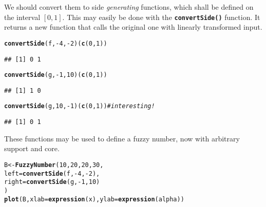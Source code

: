 \documentclass[11pt]{article}\usepackage[]{graphicx}\usepackage[]{color}
\makeatletter
\newcommand{\hlnum}[1]{\textcolor[rgb]{0.686,0.059,0.569}{#1}}%
\newcommand{\hlcom}[1]{\textcolor[rgb]{0.678,0.584,0.686}{\textit{#1}}}%
\newcommand{\hlopt}[1]{\textcolor[rgb]{0,0,0}{#1}}%
\newcommand{\hlstd}[1]{\textcolor[rgb]{0.345,0.345,0.345}{#1}}%
\newcommand{\hlkwb}[1]{\textcolor[rgb]{0.69,0.353,0.396}{#1}}%
\newcommand{\hlkwc}[1]{\textcolor[rgb]{0.333,0.667,0.333}{#1}}%
\newcommand{\hlkwd}[1]{\textcolor[rgb]{0.737,0.353,0.396}{\textbf{#1}}}%
\newenvironment{kframe}{%
 \def\at@end@of@kframe{}%
 \ifinner\ifhmode%
  \def\at@end@of@kframe{\end{minipage}}%
  \begin{minipage}{\columnwidth}%
 \fi\fi%
 \def\FrameCommand##1{\hskip\@totalleftmargin \hskip-\fboxsep
 \colorbox{shadecolor}{##1}\hskip-\fboxsep
     \hskip-\linewidth \hskip-\@totalleftmargin \hskip\columnwidth}%
 \MakeFramed {\advance\hsize-\width
   \@totalleftmargin\z@ \linewidth\hsize
   \@setminipage}}%
 {\par\unskip\endMakeFramed%
 \at@end@of@kframe}
\newenvironment{knitrout}{}{} %
\newcommand{\func}[1]{\texttt{\hlkwd{#1}}}
\makeatother
\begin{document}
We should convert them to side \textit{generating} functions, which shall be
defined on the interval $[0,1]$.
This may easily be done with the \func{convertSide()}
function. It returns a new function that calls
the original one with linearly transformed input.

\begin{knitrout}\small
{}\color{fgcolor}\begin{kframe}
\begin{alltt}
\hlkwd{convertSide}\hlstd{(f,} \hlopt{-}\hlnum{4}\hlstd{,} \hlopt{-}\hlnum{2}\hlstd{)(}\hlkwd{c}\hlstd{(}\hlnum{0}\hlstd{,}\hlnum{1}\hlstd{))}
\end{alltt}
\begin{verbatim}
## [1] 0 1
\end{verbatim}
\begin{alltt}
\hlkwd{convertSide}\hlstd{(g,} \hlopt{-}\hlnum{1}\hlstd{,} \hlnum{10}\hlstd{)(}\hlkwd{c}\hlstd{(}\hlnum{0}\hlstd{,}\hlnum{1}\hlstd{))}
\end{alltt}
\begin{verbatim}
## [1] 1 0
\end{verbatim}
\begin{alltt}
\hlkwd{convertSide}\hlstd{(g,} \hlnum{10}\hlstd{,} \hlopt{-}\hlnum{1}\hlstd{)(}\hlkwd{c}\hlstd{(}\hlnum{0}\hlstd{,}\hlnum{1}\hlstd{))} \hlcom{# interesting!}
\end{alltt}
\begin{verbatim}
## [1] 0 1
\end{verbatim}
\end{kframe}
\end{knitrout}

\noindent
These functions may be used to define a fuzzy number,
now with arbitrary support and core.

\begin{knitrout}\small
{}\color{fgcolor}\begin{kframe}
\begin{alltt}
\hlstd{B} \hlkwb{<-} \hlkwd{FuzzyNumber}\hlstd{(}\hlnum{10}\hlstd{,}\hlnum{20}\hlstd{,}\hlnum{20}\hlstd{,}\hlnum{30}\hlstd{,}
    \hlkwc{left}\hlstd{=}\hlkwd{convertSide}\hlstd{(f,} \hlopt{-}\hlnum{4}\hlstd{,} \hlopt{-}\hlnum{2}\hlstd{),}
   \hlkwc{right}\hlstd{=}\hlkwd{convertSide}\hlstd{(g,} \hlopt{-}\hlnum{1}\hlstd{,} \hlnum{10}\hlstd{)}
\hlstd{)}
\hlkwd{plot}\hlstd{(B,} \hlkwc{xlab}\hlstd{=}\hlkwd{expression}\hlstd{(x),} \hlkwc{ylab}\hlstd{=}\hlkwd{expression}\hlstd{(alpha))}
\end{alltt}
\end{kframe}
\end{knitrout}
\end{document}
